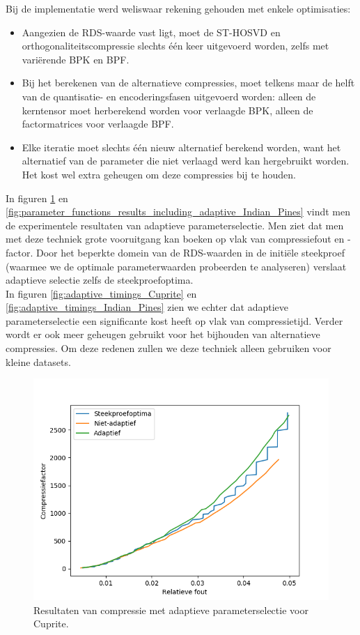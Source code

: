 Bij de implementatie werd weliswaar rekening gehouden met enkele optimisaties:
\begin{itemize}
\item Aangezien de RDS-waarde vast ligt, moet de ST-HOSVD en orthogonaliteitscompressie slechts \'e\'en keer uitgevoerd worden, zelfs met vari\"erende BPK en BPF.
\item Bij het berekenen van de alternatieve compressies, moet telkens maar de helft van de quantisatie- en encoderingsfasen uitgevoerd worden: alleen de kerntensor moet herberekend worden voor verlaagde BPK, alleen de factormatrices voor verlaagde BPF.
\item Elke iteratie moet slechts \'e\'en nieuw alternatief berekend worden, want het alternatief van de parameter die niet verlaagd werd kan hergebruikt worden. Het kost wel extra geheugen om deze compressies bij te houden.
\end{itemize}

In figuren \ref{fig:parameter_functions_results_including_adaptive_Cuprite} en \ref{fig:parameter_functions_results_including_adaptive_Indian_Pines} vindt men de experimentele resultaten van adaptieve parameterselectie. Men ziet dat men met deze techniek grote vooruitgang kan boeken op vlak van compressiefout en -factor. Door het beperkte domein van de RDS-waarden in de initi\"ele steekproef (waarmee we de optimale parameterwaarden probeerden te analyseren) verslaat adaptieve selectie zelfs de steekproefoptima.\\

In figuren \ref{fig:adaptive_timings_Cuprite} en \ref{fig:adaptive_timings_Indian_Pines} zien we echter dat adaptieve parameterselectie een significante kost heeft op vlak van compressietijd. Verder wordt er ook meer geheugen gebruikt voor het bijhouden van alternatieve compressies. Om deze redenen zullen we deze techniek alleen gebruiken voor kleine datasets.

\newpage
\begin{figure}[H]
  \centering
  \includegraphics[scale=0.7]{images/parameter_functions_results_including_adaptive_Cuprite.png}
  \caption{Resultaten van compressie met adaptieve parameterselectie voor Cuprite.}
  \label{fig:parameter_functions_results_including_adaptive_Cuprite}
\end{figure}

